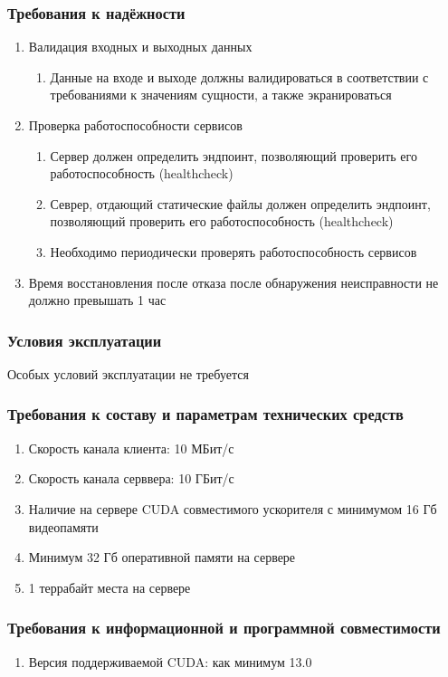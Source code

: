 \documentclass[14pt]{extarticle}
\begin{document}
\subsubsection{Требования к надёжности}
\begin{enumerate}
	\item Валидация входных и выходных данных
	\begin{enumerate}
		\item Данные на входе и выходе должны валидироваться в соответствии с требованиями к значениям сущности, а также экранироваться
	\end{enumerate}
	\item Проверка работоспособности сервисов
	\begin{enumerate}
		\item Сервер должен определить эндпоинт, позволяющий проверить его работоспособность (healthcheck)
		\item Севрер, отдающий статические файлы должен определить эндпоинт, позволяющий проверить его работоспособность (healthcheck)
		\item Необходимо периодически проверять работоспособность сервисов
	\end{enumerate}
	\item Время восстановления после отказа после обнаружения неисправности не должно превышать 1 час
\end{enumerate}
\subsubsection{Условия эксплуатации}
Особых условий эксплуатации не требуется
\subsubsection{Требования к составу и параметрам технических средств}
\begin{enumerate}
	\item Скорость канала клиента: 10 МБит/с
	\item Скорость канала серввера: 10 ГБит/с
	\item Наличие на сервере CUDA совместимого ускорителя с минимумом 16 Гб видеопамяти
	\item Минимум 32 Гб оперативной памяти на сервере
	\item 1 террабайт места на сервере 
\end{enumerate}

\subsubsection{Требования к информационной и программной совместимости}
\begin{enumerate}
	\item Версия поддерживаемой CUDA: как минимум 13.0
\end{enumerate}
\end{document}
